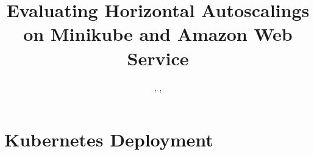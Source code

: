 \documentclass[journal]{IEEEtran}
\begin{document}


\title{Evaluating Horizontal Autoscalings on Minikube and Amazon Web Service }

\author{
  \authorOne,
  \authorTwo,
  \authorThree
}



\maketitle











\newpage
\appendices
\section{Kubernetes Deployment} \label{appendix:php_apache}


\end{document}
